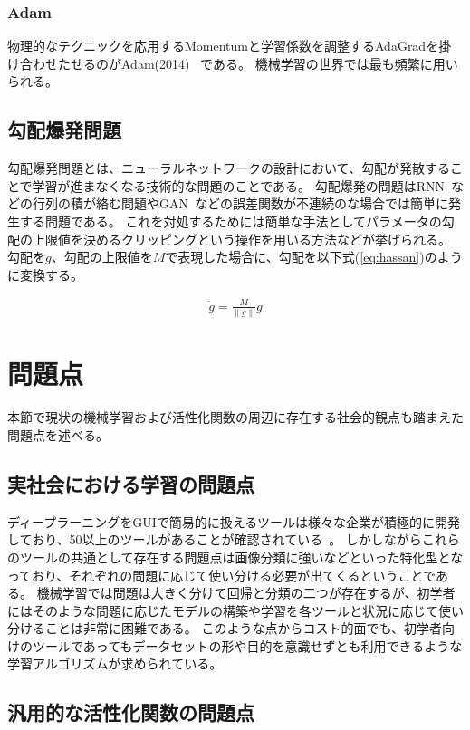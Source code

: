\subsubsection{Adam}
物理的なテクニックを応用するMomentumと学習係数を調整するAdaGradを掛け合わせたせるのがAdam(2014)~\cite{adam} である。
機械学習の世界では最も頻繁に用いられる。



\subsection{勾配爆発問題}
\label{bakuhatsu}
勾配爆発問題とは、ニューラルネットワークの設計において、勾配が発散することで学習が進まなくなる技術的な問題のことである。
勾配爆発の問題はRNN~\cite{rnn}などの行列の積が絡む問題やGAN~\cite{gan}などの誤差関数が不連続のな場合では簡単に発生する問題である。
これを対処するためには簡単な手法としてパラメータの勾配の上限値を決めるクリッピングという操作を用いる方法などが挙げられる。
勾配を$ g $、勾配の上限値を$ M $で表現した場合に、勾配を以下式(\ref{eq:hassan})のように変換する。


\begin{eqnarray}
\dot g = \frac{M}{\|g\|} g
\label{eq:hassan}
\end{eqnarray}


\section{問題点}

本節で現状の機械学習および活性化関数の周辺に存在する社会的観点も踏まえた問題点を述べる。

\subsection{実社会における学習の問題点}

ディープラーニングをGUIで簡易的に扱えるツールは様々な企業が積極的に開発しており、50以上のツールがあることが確認されている~\cite{gui}。
しかしながらこれらのツールの共通として存在する問題点は画像分類に強いなどといった特化型となっており、それぞれの問題に応じて使い分ける必要が出てくるということである。
機械学習では問題は大きく分けて回帰と分類の二つが存在するが、初学者にはそのような問題に応じたモデルの構築や学習を各ツールと状況に応じて使い分けることは非常に困難である。
このような点からコスト的面でも、初学者向けのツールであってもデータセットの形や目的を意識せずとも利用できるような学習アルゴリズムが求められている。


\subsection{汎用的な活性化関数の問題点}

